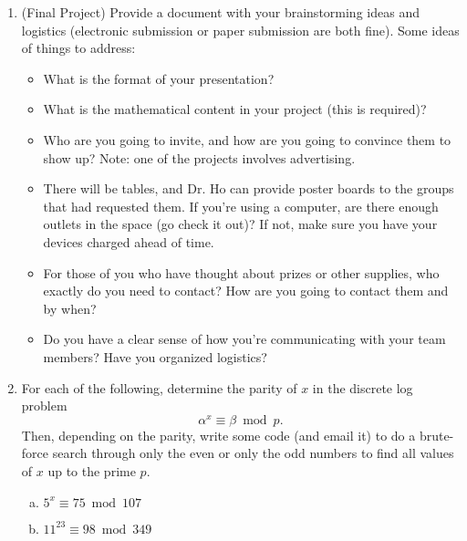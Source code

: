 \documentclass[12pt]{amsart}
\theoremstyle{plain}
\theoremstyle{definition}
\begin{document}
\begin{enumerate}[1.]
	\item (Final Project) Provide a document with your brainstorming ideas and logistics (electronic submission or paper submission are both fine).  Some ideas of things to address:
    \begin{itemize}
    	\item What is the format of your presentation?
		\item What is the mathematical content in your project (this is required)?
        \item Who are you going to invite, and how are you going to convince them to show up?  Note: one of the projects involves advertising.
        \item There will be tables, and Dr. Ho can provide poster boards to the groups that had requested them. If you're using a computer, are there enough outlets in the space (go check it out)?  If not, make sure you have your devices charged ahead of time.
        \item For those of you who have thought about prizes or other supplies, who exactly do you need to contact?  How are you going to contact them and by when?
        \item Do you have a clear sense of how you're communicating with your team members?  Have you organized logistics?\\
    \end{itemize}
    \item For each of the following, determine the parity of $x$ in the discrete log problem $$\alpha^x \equiv \beta \bmod p.$$  Then, depending on the parity, write some code (and email it) to do a brute-force search through only the even or only the odd numbers to find all values of $x$ up to the prime $p$.
    	\begin{enumerate}[a.]
        	\item $5^x \equiv 75 \bmod 107$
            \begin{framed}
            \vspace{1.2in}
            \end{framed}
            \item $11^{23} \equiv 98 \bmod 349$
            \begin{framed}
            \vspace{1.2in}
            \end{framed}
        \end{enumerate}
     

\end{enumerate}
\end{document}
